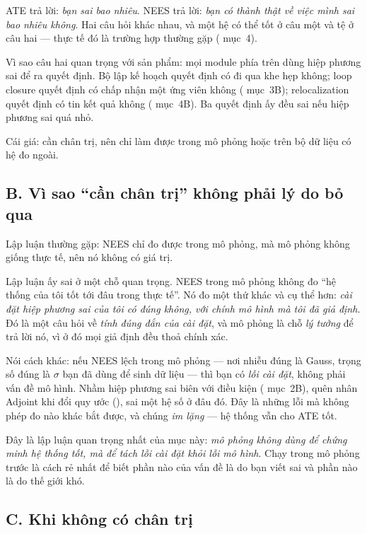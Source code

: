 \documentclass[../../vslam.tex]{subfiles}
\begin{document}
ATE trả lời: \emph{bạn sai bao nhiêu}. NEES trả lời: \emph{bạn có thành thật về việc mình sai bao nhiêu không}. Hai câu hỏi khác nhau, và một hệ có thể tốt ở câu một và tệ ở câu hai --- thực tế đó là trường hợp thường gặp ( mục~4).

Vì sao câu hai quan trọng với sản phẩm: mọi module phía trên dùng hiệp phương sai để ra quyết định. Bộ lập kế hoạch quyết định có đi qua khe hẹp không; loop closure quyết định có chấp nhận một ứng viên không ( mục~3B); relocalization quyết định có tin kết quả không ( mục~4B). Ba quyết định ấy đều sai nếu hiệp phương sai quá nhỏ.

Cái giá: cần chân trị, nên chỉ làm được trong mô phỏng hoặc trên bộ dữ liệu có hệ đo ngoài.

\subsection{B. Vì sao ``cần chân trị'' không phải lý do bỏ qua}

Lập luận thường gặp: NEES chỉ đo được trong mô phỏng, mà mô phỏng không giống thực tế, nên nó không có giá trị.

Lập luận ấy sai ở một chỗ quan trọng. NEES trong mô phỏng không đo ``hệ thống của tôi tốt tới đâu trong thực tế''. Nó đo một thứ khác và cụ thể hơn: \emph{cài đặt hiệp phương sai của tôi có đúng không, với chính mô hình mà tôi đã giả định}. Đó là một câu hỏi về \emph{tính đúng đắn của cài đặt}, và mô phỏng là chỗ \emph{lý tưởng} để trả lời nó, vì ở đó mọi giả định đều thoả chính xác.

Nói cách khác: nếu NEES lệch trong mô phỏng --- nơi nhiễu đúng là Gauss, trọng số đúng là \(\sigma\) bạn đã dùng để sinh dữ liệu --- thì bạn có \emph{lỗi cài đặt}, không phải vấn đề mô hình. Nhầm hiệp phương sai biên với điều kiện ( mục~2B), quên nhân Adjoint khi đổi quy ước (), sai một hệ số ở đâu đó. Đây là những lỗi mà không phép đo nào khác bắt được, và chúng \emph{im lặng} --- hệ thống vẫn cho ATE tốt.

Đây là lập luận quan trọng nhất của mục này: \emph{mô phỏng không dùng để chứng minh hệ thống tốt, mà để tách lỗi cài đặt khỏi lỗi mô hình}. Chạy trong mô phỏng trước là cách rẻ nhất để biết phần nào của vấn đề là do bạn viết sai và phần nào là do thế giới khó.

\subsection{C. Khi không có chân trị}
\end{document}

